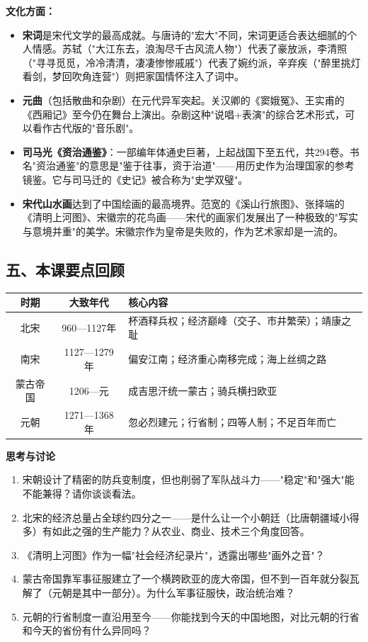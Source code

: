 \documentclass[a4paper,12pt]{ctexart}
\begin{document}
\textbf{文化方面：}
\begin{itemize}
  \item \textbf{宋词}是宋代文学的最高成就。与唐诗的"宏大"不同，宋词更适合表达细腻的个人情感。苏轼（"大江东去，浪淘尽千古风流人物"）代表了豪放派，李清照（"寻寻觅觅，冷冷清清，凄凄惨惨戚戚"）代表了婉约派，辛弃疾（"醉里挑灯看剑，梦回吹角连营"）则把家国情怀注入了词中。
  \item \textbf{元曲}（包括散曲和杂剧）在元代异军突起。关汉卿的《窦娥冤》、王实甫的《西厢记》至今仍在舞台上演出。杂剧这种"说唱+表演"的综合艺术形式，可以看作古代版的"音乐剧"。
  \item \textbf{司马光《资治通鉴》}：一部编年体通史巨著，上起战国下至五代，共294卷。书名"资治通鉴"的意思是"鉴于往事，资于治道"——用历史作为治理国家的参考镜鉴。它与司马迁的《史记》被合称为"史学双璧"。
  \item \textbf{宋代山水画}达到了中国绘画的最高境界。范宽的《溪山行旅图》、张择端的《清明上河图》、宋徽宗的花鸟画——宋代的画家们发展出了一种极致的"写实与意境并重"的美学。宋徽宗作为皇帝是失败的，作为艺术家却是一流的。
\end{itemize}

\subsection*{五、本课要点回顾}

\begin{center}
\begin{tabular}{|c|c|p{8cm}|}
\hline
\textbf{时期} & \textbf{大致年代} & \textbf{核心内容} \\
\hline
北宋 & 960—1127年 & 杯酒释兵权；经济巅峰（交子、市井繁荣）；靖康之耻 \\
\hline
南宋 & 1127—1279年 & 偏安江南；经济重心南移完成；海上丝绸之路 \\
\hline
蒙古帝国 & 1206—元 & 成吉思汗统一蒙古；骑兵横扫欧亚 \\
\hline
元朝 & 1271—1368年 & 忽必烈建元；行省制；四等人制；不足百年而亡 \\
\hline
\end{tabular}
\end{center}

{\large\textcolor{orange!80!black}{\textbf{思考与讨论}}}
\begin{enumerate}
  \item 宋朝设计了精密的防兵变制度，但也削弱了军队战斗力——"稳定"和"强大"能不能兼得？请你谈谈看法。
  \item 北宋的经济总量占全球约四分之一——是什么让一个小朝廷（比唐朝疆域小得多）有如此之强的生产能力？从农业、商业、技术三个角度回答。
  \item 《清明上河图》作为一幅"社会经济纪录片"，透露出哪些"画外之音"？
  \item 蒙古帝国靠军事征服建立了一个横跨欧亚的庞大帝国，但不到一百年就分裂瓦解了（元朝是其中一部分）。为什么军事征服快，政治统治难？
  \item 元朝的行省制度一直沿用至今——你能找到今天的中国地图，对比元朝的行省和今天的省份有什么异同吗？
\end{enumerate}
\end{document}
